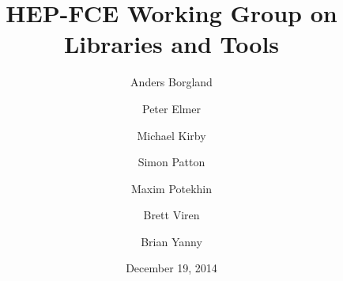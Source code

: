 \title{HEP-FCE Working Group on Libraries and Tools}

\author{Anders Borgland}

\author{Peter Elmer}

\author{Michael Kirby}

\author{Simon Patton}

\author{Maxim Potekhin}

\author{Brett Viren}

\author{Brian Yanny}


\date{December 19, 2014}
\maketitle


\tableofcontents
\pagebreak